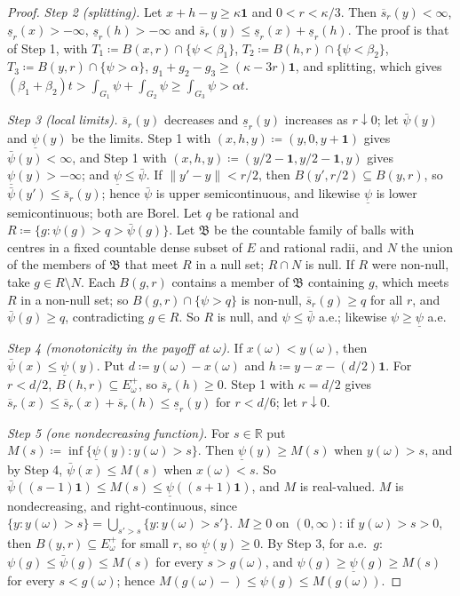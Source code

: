 \documentclass[11pt]{article}
\theoremstyle{definition}
\newcommand{\R}{\mathbb R}
\newcommand{\one}{\mathbf 1}
\newcommand{\Ep}{E^{+}}
\begin{document}
\begin{proof}
\emph{Step 2 (splitting).} Let $x+h-y\ge\kappa\one$ and $0<r<\kappa/3$. Then $\overline s_r(y)<\infty$, $\underline s_r(x)>-\infty$, $\underline s_r(h)>-\infty$ and $\overline s_r(y)\le \underline s_r(x)+\underline s_r(h)$. The proof is that of Step 1, with $T_1\coloneqq B(x,r)\cap\{\psi<\beta_1\}$, $T_2\coloneqq B(h,r)\cap\{\psi<\beta_2\}$, $T_3\coloneqq B(y,r)\cap\{\psi>\alpha\}$, $g_1+g_2-g_3\ge(\kappa-3r)\one$, and splitting, which gives $(\beta_1+\beta_2)t>\int_{G_1}\psi+\int_{G_2}\psi\ge\int_{G_3}\psi>\alpha t$.

\emph{Step 3 (local limits).} $\overline s_r(y)$ decreases and $\underline s_r(y)$ increases as $r\downarrow0$; let $\bar\psi(y)$ and $\underline\psi(y)$ be the limits. Step 1 with $(x,h,y)\coloneqq(y,0,y+\one)$ gives $\bar\psi(y)<\infty$, and Step 1 with $(x,h,y)\coloneqq(y/2-\one,y/2-\one,y)$ gives $\underline\psi(y)>-\infty$; and $\underline\psi\le\bar\psi$. If $\|y'-y\|<r/2$, then $B(y',r/2)\subseteq B(y,r)$, so $\bar\psi(y')\le \overline s_r(y)$; hence $\bar\psi$ is upper semicontinuous, and likewise $\underline\psi$ is lower semicontinuous; both are Borel. Let $q$ be rational and $R\coloneqq\{g:\psi(g)>q>\bar\psi(g)\}$. Let $\mathfrak B$ be the countable family of balls with centres in a fixed countable dense subset of $E$ and rational radii, and $N$ the union of the members of $\mathfrak B$ that meet $R$ in a null set; $R\cap N$ is null. If $R$ were non-null, take $g\in R\setminus N$. Each $B(g,r)$ contains a member of $\mathfrak B$ containing $g$, which meets $R$ in a non-null set; so $B(g,r)\cap\{\psi>q\}$ is non-null, $\overline s_r(g)\ge q$ for all $r$, and $\bar\psi(g)\ge q$, contradicting $g\in R$. So $R$ is null, and $\psi\le\bar\psi$ a.e.; likewise $\psi\ge\underline\psi$ a.e.

\emph{Step 4 (monotonicity in the payoff at $\omega$).} If $x(\omega)<y(\omega)$, then $\bar\psi(x)\le\underline\psi(y)$. Put $d\coloneqq y(\omega)-x(\omega)$ and $h\coloneqq y-x-(d/2)\one$. For $r<d/2$, $B(h,r)\subseteq\Ep_\omega$, so $\overline s_r(h)\ge0$. Step 1 with $\kappa=d/2$ gives $\overline s_r(x)\le \overline s_r(x)+\overline s_r(h)\le \underline s_r(y)$ for $r<d/6$; let $r\downarrow0$.

\emph{Step 5 (one nondecreasing function).} For $s\in\R$ put $M(s)\coloneqq\inf\{\underline\psi(y):y(\omega)>s\}$. Then $\underline\psi(y)\ge M(s)$ when $y(\omega)>s$, and by Step 4, $\bar\psi(x)\le M(s)$ when $x(\omega)<s$. So $\bar\psi((s-1)\one)\le M(s)\le\underline\psi((s+1)\one)$, and $M$ is real-valued. $M$ is nondecreasing, and right-continuous, since $\{y:y(\omega)>s\}=\bigcup_{s'>s}\{y:y(\omega)>s'\}$. $M\ge0$ on $(0,\infty)$: if $y(\omega)>s>0$, then $B(y,r)\subseteq\Ep_\omega$ for small $r$, so $\underline\psi(y)\ge0$. By Step 3, for a.e.\ $g$: $\psi(g)\le\bar\psi(g)\le M(s)$ for every $s>g(\omega)$, and $\psi(g)\ge\underline\psi(g)\ge M(s)$ for every $s<g(\omega)$; hence $M(g(\omega)-)\le\psi(g)\le M(g(\omega))$.


\end{proof}
\end{document}
